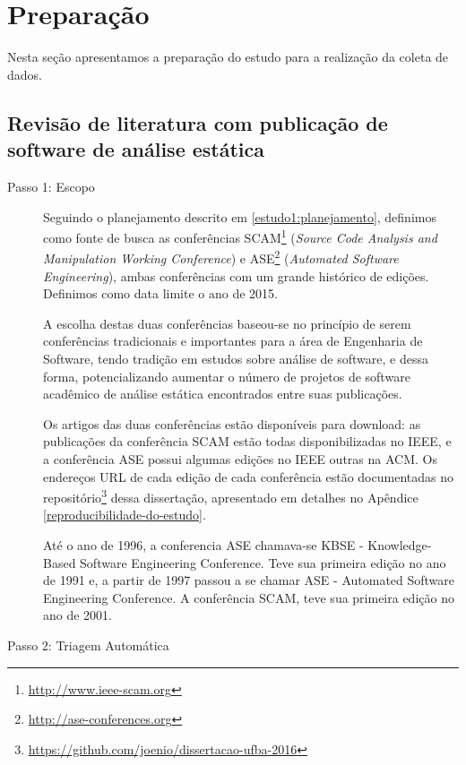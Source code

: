 
\section{Preparação} \label{estudo1:preparacao} %

Nesta seção apresentamos a preparação do estudo para a realização da coleta de
dados.

\subsection{Revisão de literatura com publicação de software de análise estática}

\begin{description}

  \item [Passo 1: Escopo]

Seguindo o planejamento descrito em \ref{estudo1:planejamento}, definimos como
fonte de busca as conferências SCAM\footnote{\url{http://www.ieee-scam.org}}
({\it Source Code Analysis and Manipulation Working Conference}) e
ASE\footnote{\url{http://ase-conferences.org}} ({\it Automated Software
Engineering}), ambas conferências com um grande histórico de edições. Definimos
como data limite o ano de 2015.

A escolha destas duas conferências baseou-se no princípio de serem conferências
tradicionais e importantes para a área de Engenharia de Software, tendo tradição
em estudos sobre análise de software, e dessa forma, potencializando aumentar
o número de projetos de software acadêmico de análise estática encontrados
entre suas publicações.

Os artigos das duas conferências estão disponíveis para download:
as publicações da conferência SCAM estão todas disponibilizadas no IEEE, e
a conferência ASE possui algumas edições no IEEE outras na ACM. Os endereços URL
de cada edição de cada conferência estão documentadas no
repositório\footnote{\url{https://github.com/joenio/dissertacao-ufba-2016}}
dessa dissertação, apresentado em detalhes no Apêndice
\ref{reproducibilidade-do-estudo}.

Até o ano de 1996, a conferencia ASE chamava-se KBSE - Knowledge-Based Software
Engineering Conference. Teve sua primeira edição no ano de 1991 e, a partir de 1997 
passou a se chamar  ASE - Automated Software Engineering Conference.
A conferência SCAM, teve sua primeira edição no ano de 2001.

  \item [Passo 2: Triagem Automática]


\end{description}
